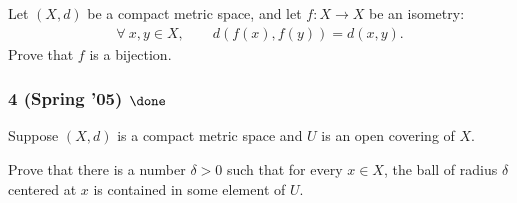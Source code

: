 \begin{problem}[?]

Let \((X, d)\) be a compact metric space, and let \(f : X \to X\) be an
isometry:
\begin{align*}
\forall~ x, y \in X, \qquad d(f (x), f (y)) = d(x, y)
.\end{align*}
Prove that \(f\) is a bijection.

\end{problem}

\hypertarget{spring-05-done}{%
\subsubsection{\texorpdfstring{4 (Spring '05)
\(\done\)}{4 (Spring '05) \textbackslash done}}\label{spring-05-done}}

\begin{problem}[?]

Suppose \((X, d)\) is a compact metric space and \(U\) is an open
covering of \(X\).

Prove that there is a number \(\delta > 0\) such that for every
\(x \in X\), the ball of radius \(\delta\) centered at \(x\) is
contained in some element of \(U\).

\end{problem}

